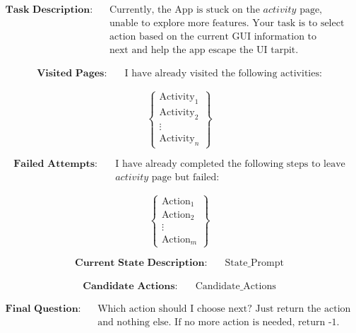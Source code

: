 \documentclass[UTF8, fontset=windows]{article}
\begin{document}
\begin{tcolorbox}[colback=white, colframe=black, title=目前使用的prompt]
    \[
    \begin{aligned}
    \textbf{Task Description:} \quad
    &\text{Currently, the App is stuck on the } activity \text{ page,} \\
    &\text{unable to explore more features. Your task is to select an} \\
    &\text{action based on the current GUI information to perform} \\
    &\text{next and help the app escape the UI tarpit.}
    \end{aligned}
    \]
    
    \[
    \begin{aligned}
    \textbf{Visited Pages:} \quad
    &\text{I have already visited the following activities:}
    \end{aligned}
    \]
    
    \[
    \begin{Bmatrix}
    \text{Activity}_1 \\
    \text{Activity}_2 \\
    \vdots \\
    \text{Activity}_n
    \end{Bmatrix}
    \]
    
    \[
    \begin{aligned}
    \textbf{Failed Attempts:} \quad
    &\text{I have already completed the following steps to leave} \\
    & activity \text{ page but failed:}
    \end{aligned}
    \]
    
    \[
    \begin{Bmatrix}
    \text{Action}_1 \\
    \text{Action}_2 \\
    \vdots \\
    \text{Action}_m
    \end{Bmatrix}
    \]
    
    \[
    \begin{aligned}
    \textbf{Current State Description:} \quad &\text{State\_Prompt}
    \end{aligned}
    \]
    
    \[
    \begin{aligned}
    \textbf{Candidate Actions:} \quad &\text{Candidate\_Actions}
    \end{aligned}
    \]
    
    \[
    \begin{aligned}
    \textbf{Final Question:} \quad
    &\text{Which action should I choose next? Just return the action id} \\
    &\text{and nothing else. If no more action is needed, return -1.}
    \end{aligned}
    \]
    \label{llm_prompt}
\end{tcolorbox}
\end{document}
